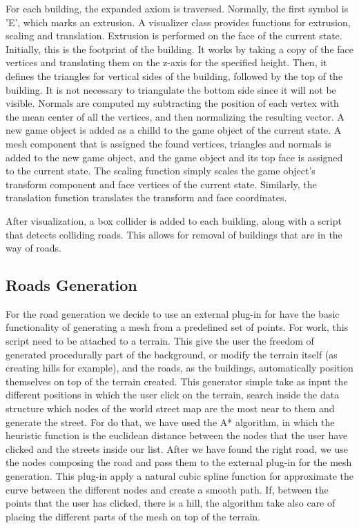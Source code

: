 \documentclass[conference]{IEEEtran}
\begin{document}
For each building, the expanded axiom is traversed. Normally, the first symbol is 'E', which marks an extrusion. A visualizer class provides functions for extrusion, scaling and translation. Extrusion is performed on the face of the current state. Initially, this is the footprint of the building. It works by taking a copy of the face vertices and translating them on the z-axis for the specified height. Then, it defines the triangles for vertical sides of the building, followed by the top of the building. It is not necessary to triangulate the bottom side since it will not be visible. Normals are computed my subtracting the position of each vertex with the mean center of all the vertices, and then normalizing the resulting vector. A new game object is added as a chilld to the game object of the current state. A mesh component that is assigned the found vertices, triangles and normals is added to the new game object, and the game object and its top face is assigned to the current state. The scaling function simply scales the game object's transform component and face vertices of the current state. Similarly, the translation function translates the transform and face coordinates.\newline

After visualization, a box collider is added to each building, along with a script that detects colliding roads. This allows for removal of buildings that are in the way of roads.

\subsection{Roads Generation}

For the road generation we decide to use an external plug-in \cite{plugin} for have the basic functionality of generating a mesh from a predefined set of points. For work, this script need to be attached to a terrain. This give the user the freedom of generated procedurally part of the background, or modify the terrain itself (as creating hills for example), and the roads, as the buildings, automatically position themselves on top of the terrain created. This generator simple take as input the different positions in which the user click on the terrain, search inside the data structure which nodes of the world street map are the most near to them and generate the street. For do that, we have used the A* algorithm, in which the heuristic function is the euclidean distance between the nodes that the user have clicked and the streets inside our list. After we have found the right road, we use the nodes composing the road and pass them to the external plug-in for the mesh generation. This plug-in apply a natural cubic spline \cite{spline} function for approximate the curve between the different nodes and create a smooth path. 
If, between the points that the user has clicked, there is a hill, the algorithm take also care of placing the different parts of the mesh on top of the terrain. 
\end{document}
